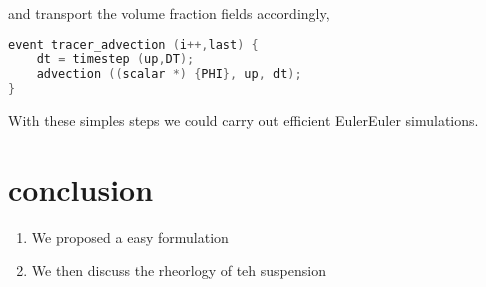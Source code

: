 and transport the volume fraction fields accordingly, 

\begin{lstlisting}[language=C]
event tracer_advection (i++,last) {
    dt = timestep (up,DT);
    advection ((scalar *) {PHI}, up, dt);
}
\end{lstlisting}
    

With these simples steps we could carry out efficient EulerEuler simulations. 


\section{conclusion}


\begin{enumerate}
    \item We proposed a easy formulation 
    \item We then discuss the rheorlogy of teh suspension 
\end{enumerate}
